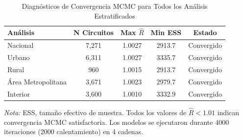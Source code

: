 \begin{table}[H]
\centering
\caption{Diagnósticos de Convergencia MCMC para Todos los Análisis Estratificados}
\label{tab:diagnostics}
\begin{tabular}{lcccc}
\toprule
\textbf{Análisis} & \textbf{N Circuitos} & \textbf{Max $\hat{R}$} & \textbf{Min ESS} & \textbf{Estado} \\
\midrule
Nacional & 7,271 & 1.0027 & 2913.7 & Convergido \\
Urbano & 6,311 & 1.0027 & 3335.7 & Convergido \\
Rural & 960 & 1.0015 & 2913.7 & Convergido \\
Área Metropolitana & 3,671 & 1.0023 & 2979.7 & Convergido \\
Interior & 3,600 & 1.0010 & 3332.9 & Convergido \\
\bottomrule
\end{tabular}
\begin{flushleft}
\footnotesize \textit{Nota:} ESS, tamaño efectivo de muestra. Todos los valores de $\hat{R} < 1.01$ indican convergencia MCMC satisfactoria. Los modelos se ejecutaron durante 4000 iteraciones (2000 calentamiento) en 4 cadenas.
\end{flushleft}
\end{table}
